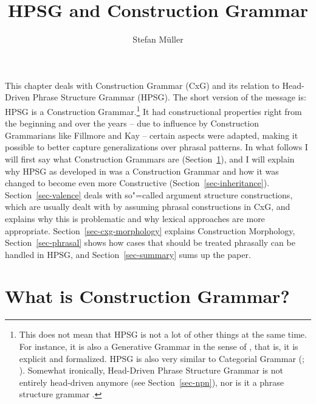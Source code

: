 \documentclass[output=paper
	        ,collection
	        ,collectionchapter
 	        ,biblatex
                ,babelshorthands
                ,newtxmath
                ,draftmode
                ,colorlinks, citecolor=brown
]{langscibook}
\author{Stefan Müller\affiliation{Humboldt-Universität zu Berlin}}
\title{HPSG and Construction Grammar}
\begin{document}
\maketitle
\label{firstpage-cxg}\label{chap-cxg}


\noindent
This chapter deals with Construction Grammar (CxG) and its relation to Head-Driven Phrase Structure
Grammar (HPSG). The short version of the message is: HPSG is a Construction Grammar.\footnote{%
  This does not mean that HPSG is not a lot of other things at the same time. For instance, it is
  also a Generative Grammar in the sense of \citet[]{Chomsky65a}, that is, it is explicit and
  formalized. HPSG is also very similar to Categorial Grammar (\citealt{MuellerUnifying};
  ). Somewhat ironically, Head-Driven Phrase Structure Grammar is not entirely
  head-driven anymore (see Section~\ref{sec-npn}), nor is it a phrase structure grammar .
}
It had constructional properties right from the beginning and over the years -- due to influence by
Construction Grammarians like Fillmore and Kay -- certain aspects were adapted, making it possible to better
capture generalizations over phrasal patterns. In what follows I will first say what Construction
Grammars are (Section~\ref{sec-cxg}), and I will explain why HPSG as developed in \citet{ps,ps2} was a
Construction Grammar and how it was changed to become even more Constructive
(Section~\ref{sec-inheritance}). Section~\ref{sec-valence} deals with so"=called argument structure
constructions, which are usually dealt with by assuming phrasal constructions in CxG, and explains
why this is problematic and why lexical approaches are more appropriate. Section~\ref{sec-cxg-morphology} explains
Construction Morphology, Section~\ref{sec-phrasal} shows how cases that should be treated phrasally
can be handled in HPSG, and Section~\ref{sec-summary} sums up the paper.

\section{What is Construction Grammar?}
\label{sec-cxg}
\end{document}
